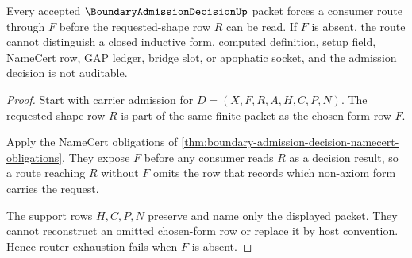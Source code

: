 \begin{theorem}
\label{thm:boundary-admission-decision-router-exhaustion}
Every accepted $\BoundaryAdmissionDecisionUp$ packet forces a consumer route through $F$ before the requested-shape row $R$ can be read. If $F$ is absent, the route cannot distinguish a closed inductive form, computed definition, setup field, NameCert row, GAP ledger, bridge slot, or apophatic socket, and the admission decision is not auditable.
\end{theorem}
\begin{proof}
Start with carrier admission for $D=(X,F,R,A,H,C,P,N)$. The requested-shape row $R$ is part of the same finite packet as the chosen-form row $F$.

Apply the NameCert obligations of \autoref{thm:boundary-admission-decision-namecert-obligations}. They expose $F$ before any consumer reads $R$ as a decision result, so a route reaching $R$ without $F$ omits the row that records which non-axiom form carries the request.

The support rows $H,C,P,N$ preserve and name only the displayed packet. They cannot reconstruct an omitted chosen-form row or replace it by host convention. Hence router exhaustion fails when $F$ is absent.
\end{proof}

